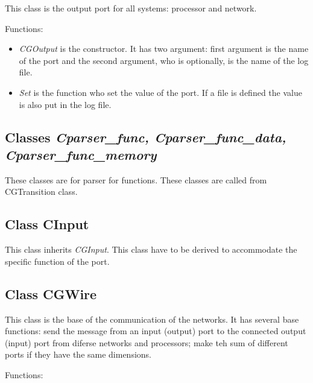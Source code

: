 \documentclass[a4paper,oneside,notitlepage]{article}
\begin{document}
This class is the output port for all systems: processor and network.

Functions:

\begin{itemize}
\item \textit{CGOutput} is the constructor. It has two argument: first
argument is the name of the port and the second argument, who is optionally,
is the name of the log file.

\item \textit{Set} is the function who set the value of the port. If a file
is defined the value is also put in the log file.
\end{itemize}

\subsection{Classes \textit{Cparser\_func, Cparser\_func\_data,
Cparser\_func\_memory}}

These classes are for parser for functions. These classes are called from
CGTransition class.

\subsection{\protect\bigskip Class CInput}

This class inherits \textit{CGInput}. This class have to be derived to
accommodate the specific function of the port.

\subsection{Class CGWire}

This class is the base of the communication of the networks. It has several
base functions: send the message from an input (output) port to the
connected output (input) port from diferse networks and processors; make teh
sum of different ports if they have the same dimensions.

Functions:
\end{document}
